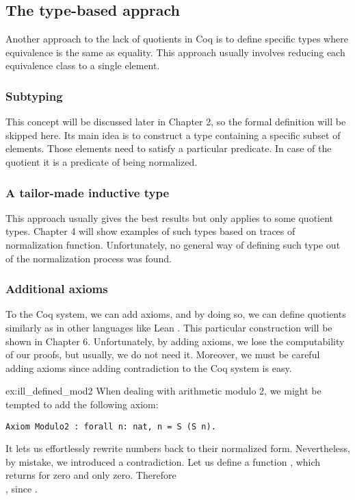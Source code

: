 \subsection{The type-based apprach}
Another approach to the lack of quotients in Coq is to define specific types 
where equivalence is the same as equality. This approach usually involves reducing each equivalence class to a single element.

\subsubsection{Subtyping}
This concept will be discussed later in Chapter 2, so the formal definition will be skipped here. Its main idea is to construct a type containing a specific subset of elements. Those elements need to satisfy a particular predicate. In case of the quotient it is a predicate of being normalized.

\subsubsection{A tailor-made inductive type}
This approach usually gives the best results but only applies to some quotient types. Chapter 4 will show examples of such types based on traces of normalization function. Unfortunately, no general way of defining such type out of the normalization process was found.

\subsubsection{Additional axioms}
To the Coq system, we can add axioms, and by doing so, we can define quotients similarly as in other languages like Lean \cite{lean4}. This particular construction will be shown in Chapter 6. Unfortunately, by adding axioms, we lose the computability of our proofs, but usually, we do not need it. Moreover, we must be careful adding axioms since adding contradiction to the Coq system is easy.
\begin{example}{}{ex:ill_defined_mod2}
When dealing with arithmetic modulo 2, we might be tempted to add the following axiom:
\begin{verbatim}
Axiom Modulo2 : forall n: nat, n = S (S n).
\end{verbatim}
It lets us effortlessly rewrite numbers back to their normalized form. Nevertheless, by mistake, we introduced a contradiction. Let us define a function , which returns  for zero and only zero. Therefore  \\ , since .
\end{example}

